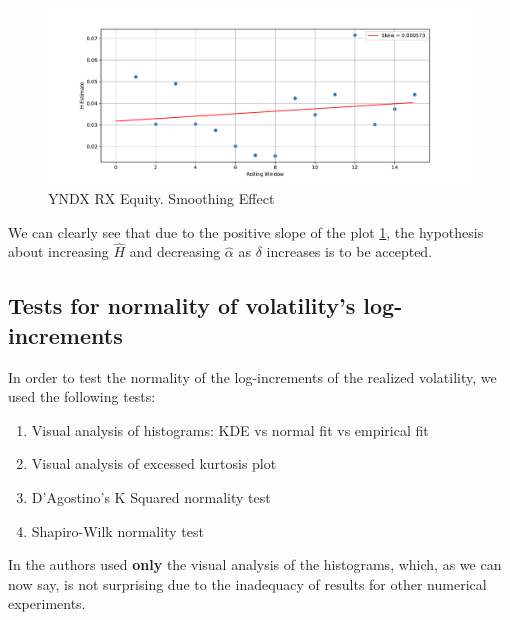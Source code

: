         \begin{figure}[htbp]
            \includegraphics[width=\textwidth]{fig/YNDX RX Equity Smoothing Effect.pdf}
            \caption{YNDX RX Equity. Smoothing Effect}
            \label{fig:smooth}
        \end{figure}

        We can clearly see that due to the positive slope of the plot \ref{fig:smooth}, the hypothesis about increasing $\hat{H}$ and decreasing $\hat{\alpha}$ as $\delta$ increases is to be accepted.

    \subsection{Tests for normality of volatility's log-increments}
        In order to test the normality of the log-increments of the realized volatility, we used the following tests:
        \begin{enumerate}
            \item Visual analysis of histograms: KDE vs normal fit vs empirical fit
            \item Visual analysis of excessed kurtosis plot
            \item D'Agostino's K Squared normality test
            \item Shapiro-Wilk normality test
        \end{enumerate}

        In \cite{GatheralRosenbaum2014} the authors used \textbf{only} the visual analysis of the 
        histograms, which, as we can now say, is not surprising due to the inadequacy of results 
        for other numerical experiments.


